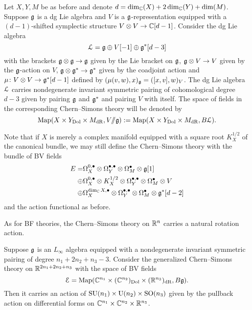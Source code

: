 \documentclass[10pt, oneside]{article}
\renewcommand{\U}{\mathrm{U}}
\newcommand{\ham}{/\!\!/}
\begin{document}
\begin{example}
Let $X,Y,M$ be as before and denote $d = \dim_\mathbb C(X) + 2\dim_\mathbb C(Y) + \dim(M)$. Suppose $\mathfrak g$ is a dg Lie algebra and $V$ is a $\mathfrak g$-representation equipped with a $(d-1)$-shifted symplectic structure $V\otimes V\rightarrow  \mathbb C[d- 1]$. Consider the dg Lie algebra
\[\mathcal L = \mathfrak g\oplus V[-1]\oplus \mathfrak g^*[d-3]\]
with the brackets $\mathfrak g\otimes \mathfrak g\rightarrow \mathfrak g$ given by the Lie bracket on $\mathfrak g$, $\mathfrak g\otimes V\rightarrow V$ given by the $\mathfrak g$-action on $V$, $\mathfrak g\otimes \mathfrak g^*\rightarrow \mathfrak g^*$ given by the coadjoint action and $\mu\colon V\otimes V\rightarrow \mathfrak g^*[d-1]$ defined by $(\mu(v, w), x)_\mathfrak g = ([x, v], w)_V$. The dg Lie algebra $\mathcal L$ carries nondegenerate invariant symmetric pairing of cohomological degree $d-3$ given by pairing $\mathfrak g$ and $\mathfrak g^*$ and pairing $V$ with itself. The space of fields in the corresponding Chern--Simons theory will be denoted by
\[\map(X\times Y_{\mr{Dol}}\times M_{\mr{dR}}, V \ham \fg):= \map(X\times Y_{\mr{Dol}}\times M_{\mr{dR}}, B \cL).\]

Note that if $X$ is merely a complex manifold equipped with a square root $K_X^{1/2}$ of the canonical bundle, we may still define the Chern--Simons theory with the bundle of BV fields
\begin{align*}
E = &\Omega^{0,\bullet}_X \otimes \Omega^{\bullet,\bullet}_Y \otimes \Omega^\bullet_M \otimes \mathfrak g[1] \\
\oplus &\Omega^{0,\bullet}_X\otimes K_X^{1/2} \otimes \Omega^{\bullet,\bullet}_Y \otimes \Omega^\bullet_M \otimes V \\
\oplus &\Omega^{\dim_\mathbb C X,\bullet}_X \otimes \Omega^{\bullet,\bullet}_Y \otimes \Omega^\bullet_M \otimes \mathfrak g^*[d-2]
\end{align*}
and the action functional as before.
\label{ex:CSHamiltonianreduction}
\end{example}

As for BF theories, the Chern--Simons theory on $\mathbb R^n$ carries a natural rotation action.

\begin{prop}
Suppose $\mathfrak g$ is an $L_\infty$ algebra equipped with a nondegenerate invariant symmetric pairing of degree $n_1+2n_2+n_3-3$. Consider the generalized Chern--Simons theory on $\mathbb R^{2n_1+2n_2+n_3}$ with the space of BV fields
\[\mathcal E = \operatorname{Map}(\mathbb C^{n_1}\times (\mathbb C^{n_2})_{\mathrm{Dol}}\times (\mathbb R^{n_3})_{\mathrm{dR}}, B\mathfrak g).\]
Then it carries an action of $\SU(n_1)\times \U(n_2)\times \SO(n_3)$ given by the pullback action on differential forms on $\mathbb C^{n_1}\times \mathbb C^{n_2}\times \mathbb R^{n_3}$.
\end{prop}
\end{document}

